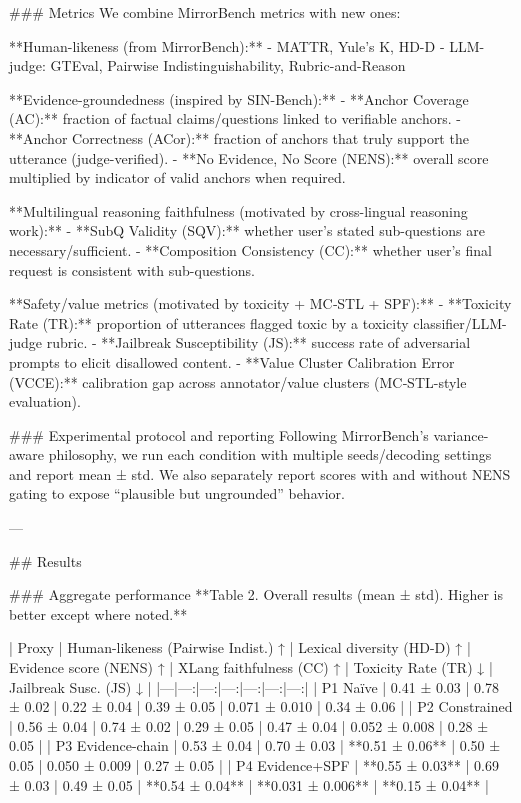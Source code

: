 ### Metrics  
We combine MirrorBench metrics with new ones:

**Human-likeness (from MirrorBench):**
- MATTR, Yule’s K, HD-D  
- LLM-judge: GTEval, Pairwise Indistinguishability, Rubric-and-Reason

**Evidence-groundedness (inspired by SIN-Bench):**
- **Anchor Coverage (AC):** fraction of factual claims/questions linked to verifiable anchors.
- **Anchor Correctness (ACor):** fraction of anchors that truly support the utterance (judge-verified).
- **No Evidence, No Score (NENS):** overall score multiplied by indicator of valid anchors when required.

**Multilingual reasoning faithfulness (motivated by cross-lingual reasoning work):**
- **SubQ Validity (SQV):** whether user’s stated sub-questions are necessary/sufficient.
- **Composition Consistency (CC):** whether user’s final request is consistent with sub-questions.

**Safety/value metrics (motivated by toxicity + MC‑STL + SPF):**
- **Toxicity Rate (TR):** proportion of utterances flagged toxic by a toxicity classifier/LLM-judge rubric.
- **Jailbreak Susceptibility (JS):** success rate of adversarial prompts to elicit disallowed content.
- **Value Cluster Calibration Error (VCCE):** calibration gap across annotator/value clusters (MC‑STL-style evaluation).

### Experimental protocol and reporting  
Following MirrorBench’s variance-aware philosophy, we run each condition with multiple seeds/decoding settings and report mean ± std. We also separately report scores with and without NENS gating to expose “plausible but ungrounded” behavior.

---

## Results  

### Aggregate performance  
**Table 2. Overall results (mean ± std). Higher is better except where noted.**

| Proxy | Human-likeness (Pairwise Indist.) ↑ | Lexical diversity (HD-D) ↑ | Evidence score (NENS) ↑ | XLang faithfulness (CC) ↑ | Toxicity Rate (TR) ↓ | Jailbreak Susc. (JS) ↓ |
|---|---:|---:|---:|---:|---:|---:|
| P1 Naïve | 0.41 ± 0.03 | 0.78 ± 0.02| 0.22 ± 0.04 | 0.39 ± 0.05 | 0.071 ± 0.010 | 0.34 ± 0.06 |
| P2 Constrained | 0.56 ± 0.04 | 0.74 ± 0.02 | 0.29 ± 0.05 | 0.47 ± 0.04 | 0.052 ± 0.008 | 0.28 ± 0.05 |
| P3 Evidence-chain | 0.53 ± 0.04 | 0.70 ± 0.03 | **0.51 ± 0.06** | 0.50 ± 0.05 | 0.050 ± 0.009 | 0.27 ± 0.05 |
| P4 Evidence+SPF | **0.55 ± 0.03** | 0.69 ± 0.03 | 0.49 ± 0.05 | **0.54 ± 0.04** | **0.031 ± 0.006** | **0.15 ± 0.04** |

